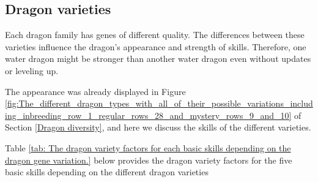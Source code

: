 \documentclass[12pt]{article}
\begin{document}
\subsection{Dragon varieties}
\label{Dragon varieties}  \par

Each dragon family has genes of different quality. The differences between these varieties influence the dragon’s appearance and strength of skills. Therefore, one water dragon might be stronger than another water dragon even without updates or leveling up.\par

The appearance was already displayed in Figure  \ref{fig:The_different_dragon_types_with_all_of_their_possible_variations_including_inbreeding_row_1_regular_rows_28_and_mystery_rows_9_and_10} of Section \ref{Dragon diversity}, and here we discuss the skills of the different varieties.\par

 Table \ref{tab: The dragon variety factors for each basic skills depending on the dragon gene variation.} below provides the dragon variety factors for the five basic skills depending on the different dragon varieties \par



\end{document}
